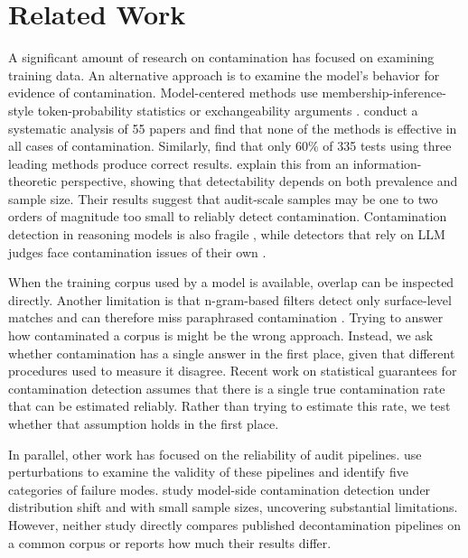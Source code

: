\documentclass[11pt]{article}
\begin{document}
\section{Related Work}

A significant amount of research on contamination has focused on examining training data. An alternative approach is to examine the model's behavior for evidence of contamination. Model-centered methods use membership-inference-style token-probability statistics \citep{shi2024detectingpretrainingdatalarge} or exchangeability arguments \citep{oren2024}. \citet{gemreview} conduct a systematic analysis of 55 papers and find that none of the methods is effective in all cases of contamination. Similarly, \citet{reliabilitygap} find that only 60\% of 335 tests using three leading methods produce correct results. \citet{detectable} explain this from an information-theoretic perspective, showing that detectability depends on both prevalence and sample size. Their results suggest that audit-scale samples may be one to two orders of magnitude too small to reliably detect contamination. Contamination detection in reasoning models is also fragile \citep{fragility}, while detectors that rely on LLM judges face contamination issues of their own \citep{preferenceleakage,judgerobustness}.

When the training corpus used by a model is available, overlap can be inspected directly. Another limitation is that n-gram-based filters detect only surface-level matches and can therefore miss paraphrased contamination \citep{yang2023rephrase}. Trying to answer how contaminated a corpus is might be the wrong approach. Instead, we ask whether contamination has a single answer in the first place, given that different procedures used to measure it disagree. Recent work on statistical guarantees for contamination detection \citep{controllable} assumes that there is a single true contamination rate that can be estimated reliably. Rather than trying to estimate this rate, we test whether that assumption holds in the first place.

In parallel, other work has focused on the reliability of audit pipelines. \citet{auditingtheaudit} use perturbations to examine the validity of these pipelines and identify five categories of failure modes. \citet{reliabilitygap} study model-side contamination detection under distribution shift and with small sample sizes, uncovering substantial limitations.  However, neither study directly compares published decontamination pipelines on a common corpus or reports how much their results differ.
\end{document}

